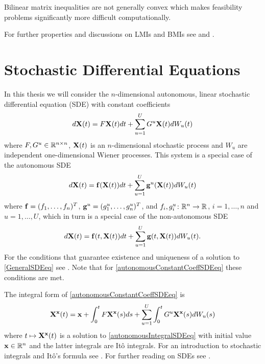 \documentclass[a4paper,12pt,twoside,BCOR=10mm]{scrbook}
\begin{document}
Bilinear matrix inequalities are not generally convex which makes feasibility problems significantly more difficult computationally.

For further properties and discussions on LMIs and BMIs see \citep{vABr2000lmibmi} and \citep{KZM2018BMI1}.

\section{Stochastic Differential Equations}\label{SectionSDE}
In this thesis we will consider the $n$-dimensional autonomous, linear stochastic differential equation (SDE) with constant coefficients
\begin{align}\label{autonomousConstantCoeffSDEeq}
    d\mathbf{X}(t) = F\mathbf{X}(t)dt + \sum\limits_{u = 1}^UG^u \mathbf{X}(t)dW_u(t)
\end{align}
where $F,G^u \in \mathbb{R}^{n\times n}$, $\mathbf{X}(t)$ is an $n$-dimensional stochastic process and $W_u$ are independent one-dimensional Wiener processes.
This system is a special case of the autonomous SDE
\begin{align}\label{autonomousGeneralSDEeq}
    d\mathbf{X}(t) = \mathbf{f}(\mathbf{X}(t))dt + \sum_{u=1}^U \mathbf{g}^u(\mathbf{X}(t))dW_u(t)
\end{align}
where $\mathbf{f} = (f_1, \ldots, f_n)^T$, $\mathbf{g}^u = (g_1^u,\ldots,g_n^u)^T$, and $f_i, g_i^u\colon \mathbb{R}^{n} \to \mathbb{R}^{} $, $i = 1, \ldots, n$ and $u = 1,\ldots, U$, which in turn is a special case of the non-autonomous SDE
\begin{align}\label{GeneralSDEeq}
    d\mathbf{X}(t) = \mathbf{f}(t, \mathbf{X}(t))dt + \sum\limits_{u=1}^U\mathbf{g}(t, \mathbf{X}(t))dW_u(t).
\end{align}
For the conditions that guarantee existence and uniqueness of a solution to \eqref{GeneralSDEeq} see \citep{mao2007stochastic}. Note that for \eqref{autonomousConstantCoeffSDEeq} these conditions are met.

The integral form of \eqref{autonomousConstantCoeffSDEeq} is
\begin{align}\label{autonomousIntegralSDEeq}
    \mathbf{X}^{\mathbf{x}}(t) = \mathbf{x} + \int_0^tF\mathbf{X}^{\mathbf{x}}(s)ds + \sum_{u = 1}^U \int_0^tG^u\mathbf{X}^{\mathbf{x}}(s)dW_u(s)
\end{align}
where $t \mapsto \mathbf{X}^{\mathbf{x}} (t)$ is a solution to \eqref{autonomousIntegralSDEeq} with initial value $\mathbf{x}\in\mathbb{R}^{n}$ and the latter integrals are Itô integrals. For an introduction to stochastic integrals and Itô's formula see \citep{brzezniak2000basic}. For further reading on SDEs see \citep{sdestab1974arnold, sdeoks2010, mao2007stochastic, sdestab2012khaminskii}.
\end{document}
